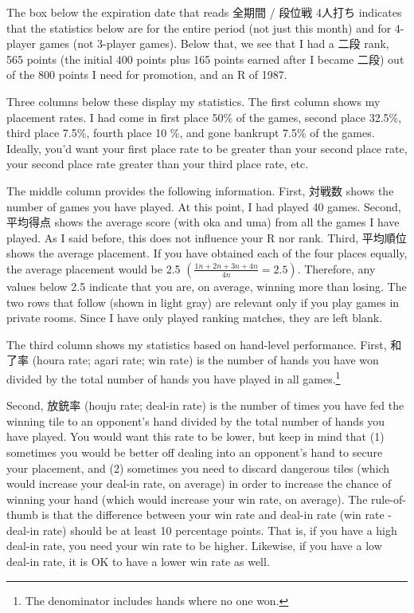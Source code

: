 \bigskip

The box below the expiration date that reads 全期間 / 段位戦 4人打ち indicates that the statistics below are for the entire period (not just this month) and for 4-player games (not 3-player games). Below that, we see that I had a 二段 rank, 565 points (the initial 400 points plus 165 points earned after I became 二段) out of the 800 points I need for promotion, and an R of 1987. 

\bigskip

Three columns below these display my statistics. The first column shows my placement rates. I had come in first place 50\% of the games, second place 32.5\%, third place 7.5\%, fourth place 10 \%, and gone bankrupt 7.5\% of the games. Ideally, you'd want your first place rate to be greater than your second place rate, your second place rate greater than your third place rate, etc. 

\bigskip

The middle column provides the following information. First, 対戦数 shows the number of games you have played. At this point, I had played 40 games. Second, 平均得点 shows the average score (with {\jap oka} and {\jap uma}) from all the games I have played. As I said before, this does not influence your R nor rank. Third, 平均順位 shows the average placement. If you have obtained each of the four places equally, the average placement would be 2.5 $\left( \frac{1  n + 2  n + 3  n + 4 n}{4n} = 2.5 \right)$. Therefore, any values below 2.5 indicate that you are, on average, winning more than losing. 
The two rows that follow (shown in light gray) are relevant only if you play games in private rooms. Since I have only played ranking matches, they are left blank. 

\bigskip

The third column shows my statistics based on hand-level performance. First, 和了率 ({\jap houra} rate; {\jap agari} rate; win rate) is the number of hands you have won divided by the total number of hands you have played in all games.\footnote{The denominator includes hands where no one won.} 

\bigskip
Second, 放銃率 ({\jap houju} rate; deal-in rate) is the number of times you have fed the winning tile to an opponent's hand divided by the total number of hands you have played. You would want this rate to be lower, but keep in mind that (1) sometimes you would be better off dealing into an opponent's hand to secure your placement, and (2) sometimes you need to discard dangerous tiles (which would increase your deal-in rate, on average) in order to increase the chance of winning your hand (which would increase your win rate, on average). The rule-of-thumb is that the difference between your win rate and deal-in rate (win rate - deal-in rate) should be at least 10 percentage points. That is, if you have a high deal-in rate, you need your win rate to be higher. Likewise, if you have a low deal-in rate, it is OK to have a lower win rate as well. 

